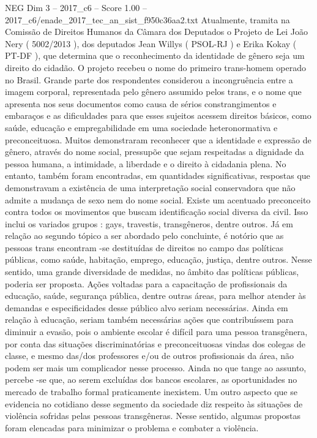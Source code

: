 \begin{textsample}{NEG Dim 3 – 2017\_c6 – Score 1.00 – 2017\_c6/enade\_2017\_tec\_an\_sist\_f950c36aa2.txt}
Atualmente, tramita na Comissão de Direitos Humanos da Câmara dos Deputados o Projeto de Lei João Nery ( 5002/2013 ), dos deputados Jean Willys ( PSOL-RJ ) e Erika Kokay ( PT-DF ), que determina que o reconhecimento da identidade de gênero seja um direito do cidadão.
O projeto recebeu o nome do primeiro trans-homem operado no Brasil.
Grande parte dos respondentes considerou a incongruência entre a imagem corporal, representada pelo gênero assumido pelos trans, e o nome que apresenta nos seus documentos como causa de sérios constrangimentos e embaraços e as dificuldades para que esses sujeitos acessem direitos básicos, como saúde, educação e empregabilidade em uma sociedade heteronormativa e preconceituosa.
Muitos demonstraram reconhecer que a identidade e expressão de gênero, através do nome social, pressupõe que sejam respeitadas a dignidade da pessoa humana, a intimidade, a liberdade e o direito à cidadania plena.
No entanto, também foram encontradas, em quantidades significativas, respostas que demonstravam a existência de uma interpretação social conservadora que não admite a mudança de sexo nem do nome social.
Existe um acentuado preconceito contra todos os movimentos que buscam identificação social diversa da civil.
Isso inclui os variados grupos : gays, travestis, transgêneros, dentre outros.
Já em relação ao segundo tópico a ser abordado pelo concluinte, é notório que as pessoas trans encontram -se destituídas de direitos no campo das políticas públicas, como saúde, habitação, emprego, educação, justiça, dentre outros.
Nesse sentido, uma grande diversidade de medidas, no âmbito das políticas públicas, poderia ser proposta.
Ações voltadas para a capacitação de profissionais da educação, saúde, segurança pública, dentre outras áreas, para melhor atender às demandas e especificidades desse público alvo seriam necessárias.
Ainda em relação à educação, seriam também necessárias ações que contribuíssem para diminuir a evasão, pois o ambiente escolar é difícil para uma pessoa transgênera, por conta das situações discriminatórias e preconceituosas vindas dos colegas de classe, e mesmo das/dos professores e/ou de outros profissionais da área, não podem ser mais um complicador nesse processo.
Ainda no que tange ao assunto, percebe -se que, ao serem excluídas dos bancos escolares, as oportunidades no mercado de trabalho formal praticamente inexistem.
Um outro aspecto que se evidencia no cotidiano desse segmento da sociedade diz respeito às situações de violência sofridas pelas pessoas transgêneras.
Nesse sentido, algumas propostas foram elencadas para minimizar o problema e combater a violência.

\end{textsample}
